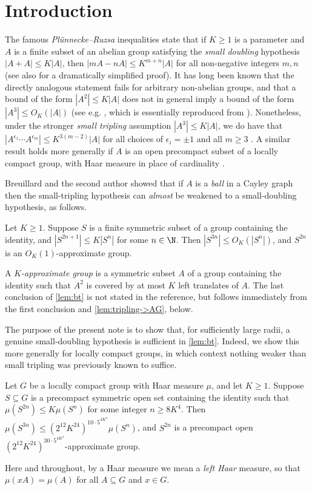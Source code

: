 \section{Introduction}
The famous \emph{Plünnecke--Ruzsa} inequalities state that if $K\ge1$ is a parameter and $A$ is a finite subset of an abelian group satisfying the \emph{small doubling} hypothesis $|A+A|\le K|A|$, then $|mA-nA|\le K^{m+n}|A|$ for all non-negative integers $m,n$ \cite{plunnecke,ruz.pl.1,ruz.pl.2} (see also \cite{petridis} for a dramatically simplified proof). It has long been known that the directly analogous statement fails for arbitrary non-abelian groups, and that a bound of the form $|A^2|\le K|A|$ does not in general imply a bound of the form $|A^3|\le O_K(|A|)$ (see e.g. \cite[Example 2.5.2]{book}, which is essentially reproduced from \cite{tao.product.set}). Nonetheless, under the stronger \emph{small tripling} assumption $|A^3|\le K|A|$, we do have that $|A^{\epsilon_1}\cdots A^{\epsilon_m}|\le K^{3(m-2)}|A|$ for all choices of $\epsilon_i=\pm1$ and all $m\ge3$ \cite[Proposition 2.5.3]{book}. A similar result holds more generally if $A$ is an open precompact subset of a locally compact group, with Haar measure in place of cardinality \cite[Lemma 3.4]{tao.product.set}.

Breuillard and the second author showed that if $A$ is a \emph{ball} in a Cayley graph then the small-tripling hypothesis can \emph{almost} be weakened to a small-doubling hypothesis, as follows.
\begin{theorem}\label{lem:bt}
Let $K\ge1$. Suppose $S$ is a finite symmetric subset of a group containing the identity, and $|S^{2n+1}|\le K|S^n|$ for some $n\in\N$. Then $|S^{3n}|\le O_K(|S^n|)$, and $S^{2n}$ is an $O_K(1)$-approximate group.
\end{theorem}
A \emph{$K$-approximate group} is a symmetric subset $A$ of a group containing the identity such that $A^2$ is covered by at most $K$ left translates of $A$. The last conclusion of \cref{lem:bt} is not stated in the reference, but follows immediately from the first conclusion and \cref{lem:tripling->AG}, below.

The purpose of the present note is to show that, for sufficiently large radii, a genuine small-doubling hypothesis is sufficient in \cref{lem:bt}. Indeed, we show this more generally for locally compact groups, in which context nothing weaker than small tripling was previously known to suffice.
\begin{theorem}\label{thm:doubling.lc}
Let $G$ be a locally compact group with Haar measure $\mu$, and let $K\ge1$. Suppose $S\subseteq G$ is a precompact symmetric open set containing the identity such that $\mu(S^{2n})\le K\mu(S^n)$ for some integer $n\ge8K^4$. Then $\mu(S^{3n})\le(2^{12}K^{24})^{10\cdot5^{4K^4}}\mu(S^n)$, and $S^{2n}$ is a precompact open $(2^{12}K^{24})^{30\cdot5^{4K^4}}$-approximate group.
\end{theorem}
Here and throughout, by a Haar measure we mean a \emph{left Haar} measure, so that $\mu(xA)=\mu(A)$ for all $A\subseteq G$ and $x\in G$.

